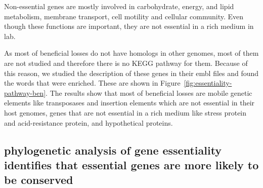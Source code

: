 \documentclass[12pt,letterpaper]{article}
\begin{document}
Non-essential genes are mostly involved in carbohydrate, energy, and lipid metabolism, membrane transport, cell motility and cellular community. Even though these functions are important, they are not essential in a rich medium in lab.

As most of beneficial losses do not have homologs in other genomes, most of them are not studied and therefore there is no KEGG pathway for them. Because of this reason, we studied the description of these genes in their embl files and found the words that were enriched. These are shown in Figure~\ref{fig:essentiality-pathway-ben}. The results show that most of beneficial losses are mobile genetic elements like transposases and insertion elements which are not essential in their host genomes, genes that are not essential in a rich medium like stress protein and acid-resistance protein, and hypothetical proteins.

\subsection{phylogenetic analysis of gene essentiality identifies that essential genes are more likely to be conserved}
\end{document}
